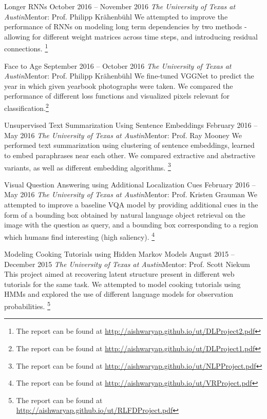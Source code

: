 \documentclass[letterpaper,10pt]{resume}
\begin{document}
{\begin{itemize}
  \credentialtwo
    {{Longer RNNs}}
    {\sf October 2016 -- November 2016}
    {\it The University of Texas at Austin}{\textsf{Mentor: Prof. Philipp Kr\"ahenb\"uhl}}
    {}
    { 
    \small 
	We attempted to improve the performance of RNNs on modeling long term dependencies by two methods - allowing for different weight matrices across time steps, and introducing residual connections. \footnote{The report can be found at \url{http://aishwaryap.github.io/ut/DLProject2.pdf}}  
    }
   \vspace{0.2cm}   
 
  \credentialtwo
    {{Face to Age}}
    {\sf September 2016 -- October 2016}
    {\it The University of Texas at Austin}{\textsf{Mentor: Prof. Philipp Kr\"ahenb\"uhl}}
    {}
    { 
    \small 
	We fine-tuned VGGNet to predict the year in which given yearbook photographs were  taken. We compared the performance of different loss functions and visualized pixels relevant for classification.\footnote{The report can be found at \url{http://aishwaryap.github.io/ut/DLProject1.pdf}} 
    }
   \vspace{0.2cm}  
 
  \credentialtwo
    {{Unsupervised Text Summarization Using Sentence Embeddings}}
    {\sf February 2016 -- May 2016}
    {\it The University of Texas at Austin}{\textsf{Mentor: Prof. Ray Mooney}}
    {}
    { 
    \small 
	We performed text summarization using clustering of sentence embeddings, learned to embed paraphrases near each other. We compared extractive and abstractive variants, as well as different embedding algorithms. \footnote{The report can be found at \url{http://aishwaryap.github.io/ut/NLPProject.pdf}}
    }
   \vspace{0.2cm}
   
  \credentialtwo
    {{Visual Question Answering using Additional Localization Cues}}
    {\sf February 2016 -- May 2016}
    {\it The University of Texas at Austin}{\textsf{Mentor: Prof. Kristen Grauman}}
    {}
    { 
    \small 
	We attempted to improve a baseline VQA model by providing additional cues in the form of a bounding box obtained by natural language object retrieval on the image with the question as query, and a bounding box corresponding to a region which humans find interesting (high saliency). \footnote{The report can be found at \url{http://aishwaryap.github.io/ut/VRProject.pdf}}
    }
   \vspace{0.2cm}
 
  \credentialtwo
    {{Modeling  Cooking  Tutorials  using  Hidden  Markov  Models}}
    {\sf August 2015 -- December 2015}
    {\it The University of Texas at Austin}{\textsf{Mentor: Prof. Scott Niekum}}
    {}
    { 
    \small This project aimed at recovering latent structure present in different web tutorials for the same task. We attempted to model cooking tutorials using HMMs and explored the use of different language models for observation probabilities. \footnote{The report can be found at \url{http://aishwaryap.github.io/ut/RLFDProject.pdf}}
    }
   \vspace{0.2cm}
   

\end{itemize}}
\end{document}
